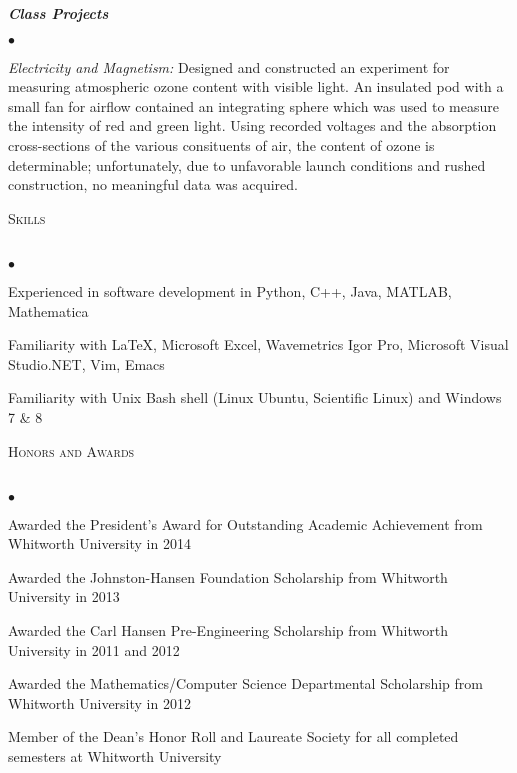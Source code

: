 \documentclass{article}
\newcommand{\lineunder}{\vspace*{-8pt} \\ \hspace*{-18pt} \hrulefill \\}
\newcommand{\header}[1]{{\hspace*{-15pt}\vspace*{6pt} \textsc{#1}} \vspace*{-6pt} \lineunder}
\newcommand{\employer}[2]{{ \textbf{#1} (#2)\\  }}
\newcommand{\position}[2]{\textbf{\emph{#1}} \emph{#2} \\ }
\newenvironment{worklist}{\begin{list}{$\bullet$}{\topsep 0pt \itemsep -2pt}}{\vspace*{0pt}\end{list}}
\newenvironment{achievements}{\begin{list}{$\bullet$}{\topsep 0pt \itemsep -2pt}}{\vspace*{4pt}\end{list}}
\begin{document}
\position{Class Projects}{}
	\begin{achievements}
	\item \emph{Electricity and Magnetism:} Designed and constructed an experiment for measuring atmospheric ozone content with visible light.  An insulated pod with a small fan for airflow contained an integrating sphere which was used to measure the intensity of red and green light.  Using recorded voltages and the absorption cross-sections of the various consituents of air, the content of ozone is determinable; unfortunately, due to unfavorable launch conditions and rushed construction, no meaningful data was acquired.
	\end{achievements}



\header{Skills}
\begin{achievements}
\item Experienced in software development in Python, C++, Java, MATLAB, Mathematica
\item Familiarity with \LaTeX, Microsoft Excel, Wavemetrics Igor Pro, Microsoft Visual Studio.NET, Vim, Emacs
\item Familiarity with Unix Bash shell (Linux Ubuntu, Scientific Linux) and Windows 7  \& 8
\end{achievements}

\header{Honors and Awards}
\begin{achievements}
\item Awarded the President's Award for Outstanding Academic Achievement from Whitworth University in 2014
\item Awarded the Johnston-Hansen Foundation Scholarship from Whitworth University in 2013
\item Awarded the Carl Hansen Pre-Engineering Scholarship from Whitworth University in 2011 and 2012
\item Awarded the Mathematics/Computer Science Departmental Scholarship from Whitworth University in 2012
\item Member of the Dean's Honor Roll and Laureate Society for all completed semesters at Whitworth University
\end{achievements}

%
%
\end{document}
